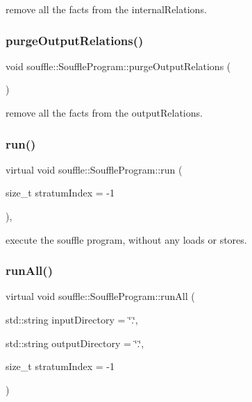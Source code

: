remove all the facts from the internal\+Relations. \mbox{\label{classsouffle_1_1_souffle_program_a1e8153fc0d1467855100d423e0d9f089}} 
\subsubsection{\texorpdfstring{purge\+Output\+Relations()}{purgeOutputRelations()}}
{\footnotesize\ttfamily void souffle\+::\+Souffle\+Program\+::purge\+Output\+Relations (\begin{DoxyParamCaption}{ }\end{DoxyParamCaption})\hspace{0.3cm}{\ttfamily [inline]}}

remove all the facts from the output\+Relations. \mbox{\label{classsouffle_1_1_souffle_program_a75c26ced8fb9dd2d6f988a1f9110f838}} 
\subsubsection{\texorpdfstring{run()}{run()}}
{\footnotesize\ttfamily virtual void souffle\+::\+Souffle\+Program\+::run (\begin{DoxyParamCaption}\item[{size\+\_\+t}]{stratum\+Index = {\ttfamily -\/1} }\end{DoxyParamCaption})\hspace{0.3cm}{\ttfamily [inline]}, {\ttfamily [virtual]}}

execute the souffle program, without any loads or stores. \mbox{\label{classsouffle_1_1_souffle_program_abad6822dd2e9ff1a74803821bb39a313}} 
\subsubsection{\texorpdfstring{run\+All()}{runAll()}}
{\footnotesize\ttfamily virtual void souffle\+::\+Souffle\+Program\+::run\+All (\begin{DoxyParamCaption}\item[{std\+::string}]{input\+Directory = {\ttfamily \char`\"{}.\char`\"{}},  }\item[{std\+::string}]{output\+Directory = {\ttfamily \char`\"{}.\char`\"{}},  }\item[{size\+\_\+t}]{stratum\+Index = {\ttfamily -\/1} }\end{DoxyParamCaption})\hspace{0.3cm}{\ttfamily [pure virtual]}}

